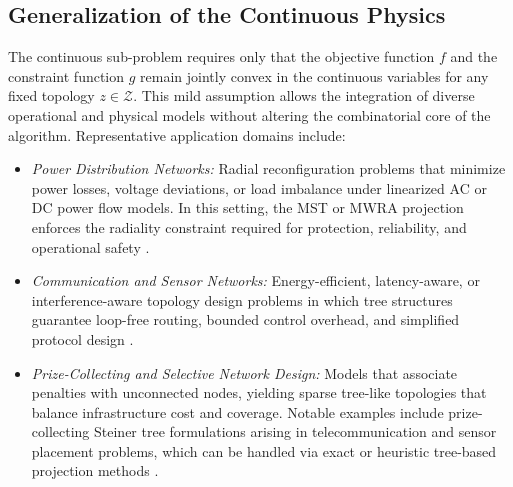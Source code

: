 \documentclass[11pt,a4paper]{article}
\theoremstyle{plain}
\theoremstyle{definition}
\theoremstyle{remark}
\begin{document}
	\subsection{Generalization of the Continuous Physics}
	The continuous sub-problem requires only that the objective function $f$ and the
	constraint function $g$ remain jointly convex in the continuous variables for
	any fixed topology $z \in \mathcal{Z}$.
	This mild assumption allows the integration of diverse operational and physical
	models without altering the combinatorial core of the algorithm.
	Representative application domains include:
	\begin{itemize}
		\item \emph{Power Distribution Networks:}
		Radial reconfiguration problems that minimize power losses, voltage
		deviations, or load imbalance under linearized AC or DC power flow models.
		In this setting, the MST or MWRA projection enforces the radiality constraint
		required for protection, reliability, and operational safety
		\cite{shen2019distributed,nejad2020scalable-bis,mokhtari2025alternating,mokhtari2024distributed}.
		
		\item \emph{Communication and Sensor Networks:}
		Energy-efficient, latency-aware, or interference-aware topology design
		problems in which tree structures guarantee loop-free routing, bounded
		control overhead, and simplified protocol design
		\cite{khan2003energy,smith2008dependency,martins2011augmented}.
		
		\item \emph{Prize-Collecting and Selective Network Design:}
		Models that associate penalties with unconnected nodes, yielding sparse
		tree-like topologies that balance infrastructure cost and coverage.
		Notable examples include prize-collecting Steiner tree formulations arising
		in telecommunication and sensor placement problems, which can be handled via
		exact or heuristic tree-based projection methods
		\cite{rehfeldt2018reduction,rehfeldt2020scip}.
	\end{itemize}
	
\end{document}
